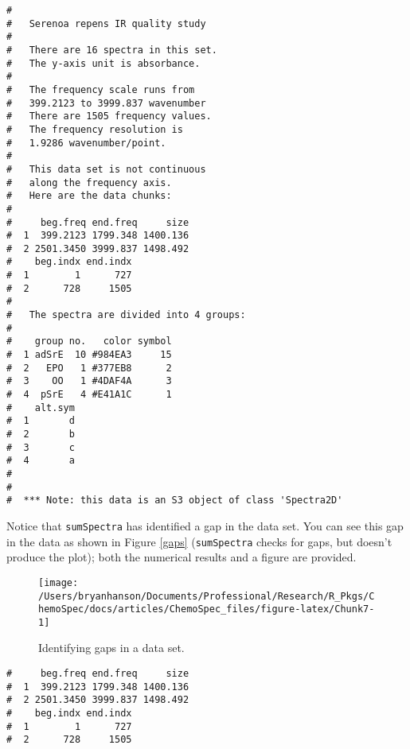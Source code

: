 \documentclass[letter,10pt,twocolumn,twoside,printwatermark=false]{pinp}
\begin{document}
\begin{ShadedResult}
\begin{verbatim}
#  
#   Serenoa repens IR quality study 
#  
#   There are 16 spectra in this set.
#   The y-axis unit is absorbance.
#  
#   The frequency scale runs from
#   399.2123 to 3999.837 wavenumber
#   There are 1505 frequency values.
#   The frequency resolution is
#   1.9286 wavenumber/point.
#  
#   This data set is not continuous
#   along the frequency axis.
#   Here are the data chunks:
#  
#     beg.freq end.freq     size
#  1  399.2123 1799.348 1400.136
#  2 2501.3450 3999.837 1498.492
#    beg.indx end.indx
#  1        1      727
#  2      728     1505
#  
#   The spectra are divided into 4 groups: 
#  
#    group no.   color symbol
#  1 adSrE  10 #984EA3     15
#  2   EPO   1 #377EB8      2
#  3    OO   1 #4DAF4A      3
#  4  pSrE   4 #E41A1C      1
#    alt.sym
#  1       d
#  2       b
#  3       c
#  4       a
#  
#  
#  *** Note: this data is an S3 object of class 'Spectra2D'
\end{verbatim}
\end{ShadedResult}

Notice that \texttt{sumSpectra} has identified a gap in the data set.
You can see this gap in the data as shown in Figure \ref{gaps}
(\texttt{sumSpectra} checks for gaps, but doesn't produce the plot);
both the numerical results and a figure are provided.

\begin{Shaded}
\begin{Highlighting}[]
\OperatorTok{$}\OperatorTok{$}\NormalTok{data[}\NormalTok{,],}
   \NormalTok{)}
\end{Highlighting}
\end{Shaded}

\begin{figure}

{\centering \texttt{[image: /Users/bryanhanson/Documents/Professional/Research/R\_Pkgs/ChemoSpec/docs/articles/ChemoSpec\_files/figure-latex/Chunk7-1]} 

}

\caption{\label{gaps}Identifying gaps in a data set.}\label{fig:Chunk7}
\end{figure}
\begin{ShadedResult}
\begin{verbatim}
#     beg.freq end.freq     size
#  1  399.2123 1799.348 1400.136
#  2 2501.3450 3999.837 1498.492
#    beg.indx end.indx
#  1        1      727
#  2      728     1505
\end{verbatim}
\end{ShadedResult}
\end{document}
